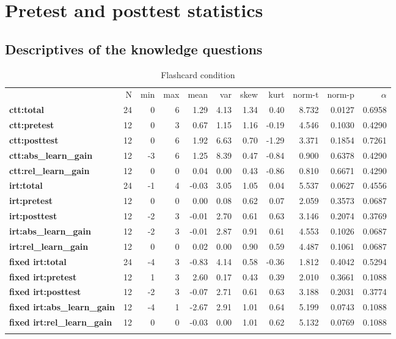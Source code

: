 \chapter{Pretest and posttest statistics}
\label{app:learning_gain}

\section{Descriptives of the knowledge questions}

\begin{longtable}[c]{@{}lrrrrrrrrrr@{}}
\caption{Flashcard condition}\\
\endfirsthead
\endhead
\toprule\addlinespace
& N & min & max & mean & var & skew & kurt & norm-t &
norm-p & $\alpha$
\\
\addlinespace
\midrule
\textbf{ctt:total} & 24 & 0 & 6 & 1.29 & 4.13 & 1.34 & 0.40 & 8.732 &
0.0127 & 0.6958
\\\addlinespace
\textbf{ctt:pretest} & 12 & 0 & 3 & 0.67 & 1.15 & 1.16 & -0.19 & 4.546 &
0.1030 & 0.4290
\\\addlinespace
\textbf{ctt:posttest} & 12 & 0 & 6 & 1.92 & 6.63 & 0.70 & -1.29 & 3.371
& 0.1854 & 0.7261
\\\addlinespace
\textbf{ctt:abs\_learn\_gain} & 12 & -3 & 6 & 1.25 & 8.39 & 0.47 & -0.84
& 0.900 & 0.6378 & 0.4290
\\\addlinespace
\textbf{ctt:rel\_learn\_gain} & 12 & 0 & 0 & 0.04 & 0.00 & 0.43 & -0.86
& 0.810 & 0.6671 & 0.4290
\\\addlinespace
\textbf{irt:total} & 24 & -1 & 4 & -0.03 & 3.05 & 1.05 & 0.04 & 5.537 &
0.0627 & 0.4556
\\\addlinespace
\textbf{irt:pretest} & 12 & 0 & 0 & 0.00 & 0.08 & 0.62 & 0.07 & 2.059 &
0.3573 & 0.0687
\\\addlinespace
\textbf{irt:posttest} & 12 & -2 & 3 & -0.01 & 2.70 & 0.61 & 0.63 & 3.146
& 0.2074 & 0.3769
\\\addlinespace
\textbf{irt:abs\_learn\_gain} & 12 & -2 & 3 & -0.01 & 2.87 & 0.91 & 0.61
& 4.553 & 0.1026 & 0.0687
\\\addlinespace
\textbf{irt:rel\_learn\_gain} & 12 & 0 & 0 & 0.02 & 0.00 & 0.90 & 0.59 &
4.487 & 0.1061 & 0.0687
\\\addlinespace
\textbf{fixed irt:total} & 24 & -4 & 3 & -0.83 & 4.14 & 0.58 & -0.36
& 1.812 & 0.4042 & 0.5294
\\\addlinespace
\textbf{fixed irt:pretest} & 12 & 1 & 3 & 2.60 & 0.17 & 0.43 & 0.39 &
2.010 & 0.3661 & 0.1088
\\\addlinespace
\textbf{fixed irt:posttest} & 12 & -2 & 3 & -0.07 & 2.71 & 0.61 &
0.63 & 3.188 & 0.2031 & 0.3774
\\\addlinespace
\textbf{fixed irt:abs\_learn\_gain} & 12 & -4 & 1 & -2.67 & 2.91 &
1.01 & 0.64 & 5.199 & 0.0743 & 0.1088
\\\addlinespace
\textbf{fixed irt:rel\_learn\_gain} & 12 & 0 & 0 & -0.03 & 0.00 &
1.01 & 0.62 & 5.132 & 0.0769 & 0.1088
\\\addlinespace
\bottomrule
    \label{tab:know_fc}
\end{longtable}

